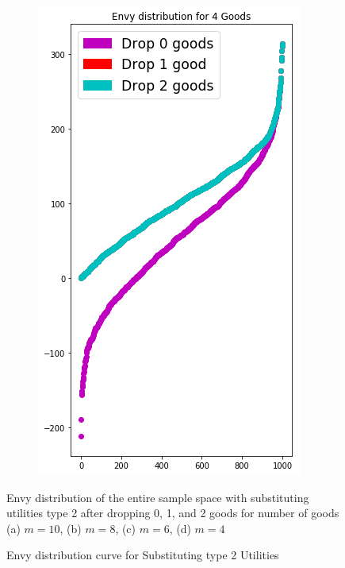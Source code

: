 \begin{figure}[h!]
\begin{subfigure}[b]{0.47\linewidth}
    \includegraphics[width=\linewidth]{images/envy_density/envy_density_us24.png}
    \caption{}
  \end{subfigure}
  \caption{Envy distribution curve for Substituting type 2 Utilities}
  \label{fig_efk_dist_curve_subst2}
  \small
    Envy distribution of the entire sample space with substituting utilities type 2 after dropping 0, 1, and 2 goods for number of goods (a) $m = 10$, (b) $m = 8$, (c) $m = 6$, (d) $m = 4$
\end{figure}


